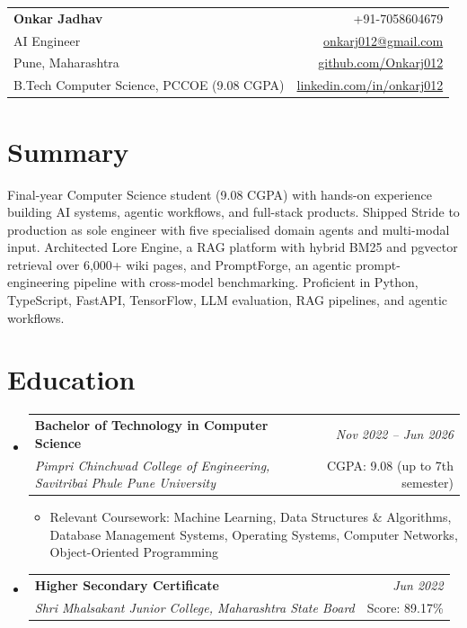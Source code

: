 \documentclass[a4paper,11pt]{article}
\makeatletter
\newcommand{\resumeSubheading}[4]{
\vspace{0.5mm}\item
    \begin{tabular*}{0.98\textwidth}[t]{l@{\extracolsep{\fill}}r}
        \textbf{#1} & \textit{\footnotesize{#4}} \\
        \textit{\footnotesize{#3}} & \footnotesize{#2}\\
    \end{tabular*}
    \vspace{-2.4mm}
}
\newcommand{\resumeSubHeadingListStart}{\begin{itemize}[leftmargin=*,labelsep=0mm]}
\newcommand{\resumeItemListStart}{\begin{justify}\begin{itemize}[leftmargin=3ex, rightmargin=2ex, noitemsep,labelsep=1.2mm,itemsep=0mm]\small}
\newcommand{\resumeSubHeadingListEnd}{\end{itemize}\vspace{2mm}}
\newcommand{\resumeItemListEnd}{\end{itemize}\end{justify}\vspace{-2mm}}
\newcommand{\name}{Onkar Jadhav}
\newcommand{\phone}{7058604679}
\newcommand{\emaila}{onkarj012@gmail.com}
\newcommand{\github}{github.com/Onkarj012}
\newcommand{\linkedin}{linkedin.com/in/onkarj012}
\makeatother
\begin{document}
\selectfont

\begin{tabularx}{\linewidth}{L r}
  \textbf{\Large \name} & {+91-\phone}\\
  {AI Engineer} & \href{mailto:\emaila}{\emaila} \\
  {Pune, Maharashtra} & \href{https://\github}{\github} \\
  {B.Tech Computer Science, PCCOE (9.08 CGPA)} & \href{https://\linkedin}{\linkedin}
\end{tabularx}
\vspace{-4mm}

\section{\textbf{Summary}}
\vspace{1mm}
\small{
Final-year Computer Science student (9.08 CGPA) with hands-on experience building AI systems, agentic workflows, and full-stack products. Shipped Stride to production as sole engineer with five specialised domain agents and multi-modal input. Architected Lore Engine, a RAG platform with hybrid BM25 and pgvector retrieval over 6,000+ wiki pages, and PromptForge, an agentic prompt-engineering pipeline with cross-model benchmarking. Proficient in Python, TypeScript, FastAPI, TensorFlow, LLM evaluation, RAG pipelines, and agentic workflows.
}
\vspace{-3mm}

\section{\textbf{Education}}
  \resumeSubHeadingListStart
    \resumeSubheading
      {Bachelor of Technology in Computer Science}{CGPA: 9.08 (up to 7th semester)}
      {Pimpri Chinchwad College of Engineering, Savitribai Phule Pune University}{Nov 2022 -- Jun 2026}
      \resumeItemListStart
        \item {Relevant Coursework: Machine Learning, Data Structures \& Algorithms, Database Management Systems, Operating Systems, Computer Networks, Object-Oriented Programming}
      \resumeItemListEnd
    \resumeSubheading
      {Higher Secondary Certificate}{Score: 89.17\%}
      {Shri Mhalsakant Junior College, Maharashtra State Board}{Jun 2022}
  \resumeSubHeadingListEnd
\vspace{-5.5mm}
\end{document}
